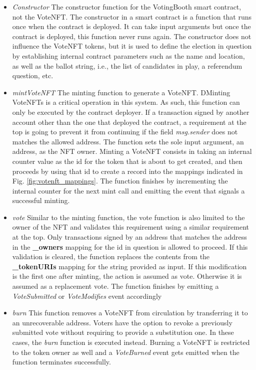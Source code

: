 \documentclass[../main.tex]{subfiles}
\begin{document}
\begin{itemize}
    \item {\textit{Constructor} The constructor function for the VotingBooth smart contract, not the VoteNFT. The constructor in a smart contract is a function that runs once when the contract is deployed. It can take input arguments but once the contract is deployed, this function never runs again. The constructor does not influence the VoteNFT tokens, but it is used to define the election in question by establishing internal contract parameters such as the name and location, as well as the ballot string, i.e., the list of candidates in play, a referendum question, etc.}
    \item {\textit{mintVoteNFT} The minting function to generate a VoteNFT. DMinting VoteNFTs is a critical operation in this system. As such, this function can only be executed by the contract deployer. If a transaction signed by another account other than the one that deployed the contract, a requirement at the top is going to prevent it from continuing if the field \textit{msg.sender} does not matches the allowed address. The function sets the sole input argument, an address, as the NFT owner. Minting a VoteNFT consists in taking an internal counter value as the id for the token that is about to get created, and then proceeds by using that id to create a record into the mappings indicated in Fig. \ref{fig:votenft_mappings}. The function finishes by incrementing the internal counter for the next mint call and emitting the event that signals a successful minting.}
    \item {\textit{vote} Similar to the minting function, the vote function is also limited to the owner of the NFT and validates this requirement using a similar requirement at the top. Only transactions signed by an address that matches the address in the \textbf{\_owners} mapping for the id in question is allowed to proceed. If this validation is cleared, the function replaces the contents from the \textbf{\_tokenURIs} mapping for the string provided as input. If this modification is the first one after minting, the action is assumed as vote. Otherwise it is assumed as a replacement vote. The function finishes by emitting a \textit{VoteSubmitted} or \textit{VoteModifies} event accordingly}
    \item {\textit{burn} This function removes a VoteNFT from circulation by transferring it to an unrecoverable address. Voters have the option to revoke a previously submitted vote without requiring to provide a substitution one. In these cases, the \textit{burn} function is executed instead. Burning a VoteNFT is restricted to the token owner as well and a \textit{VoteBurned} event gets emitted when the function terminates successfully.}
\end{itemize}
\end{document}
